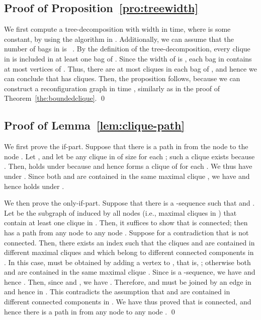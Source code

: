 \documentclass{llncs}
\newcounter{one}
\begin{document}
	\subsection{Proof of Proposition~\ref{pro:treewidth}}
We first compute a tree-decomposition  with width  in  time, where  is some constant,
	by using the algorithm in \cite{BodlaenderDDFLP13}.
	Additionally, we can assume that the number of bags in  is ~\cite{BodlaenderDDFLP13}.
	By the definition of the tree-decomposition, every clique in  is included in at least one bag of .
	Since the width of  is , each bag in  contains at most  vertices of .
	Thus, there are at most  cliques in each bag of , and hence we can conclude that  has  cliques.
	Then, the proposition follows, because we can construct a reconfiguration graph  in time , similarly as in the proof of Theorem~\ref{the:boundedclique}.
	\qed




	\subsection{Proof of Lemma~\ref{lem:clique-path}}
We first prove the if-part.
	Suppose that there is a path  in  from the node  to the node .
	Let , and let  be any clique in  of size  for each ; 
such a clique  exists because . 
	Then,  holds under  because  and hence  forms a clique of  for each .
	We thus have  under . 
	Since both  and  are contained in the same maximal clique , we have  and hence  holds under .
 
	We then prove the only-if-part.
	Suppose that there is a -sequence  such that  and .
	Let  be the subgraph of  induced by all nodes (i.e., maximal cliques in ) that contain at least one clique in .
	Then, it suffices to show that  is connected;
then  has a path from any node  to any node . 
	Suppose for a contradiction that  is not connected. 
	Then, there exists an index  such that the cliques  and  are contained in different maximal cliques  and  which belong to different connected components in . 
	In this case,  must be obtained by adding a vertex  to , that is, ;
otherwise both  and  are contained in the same maximal clique .
	Since  is a -sequence, we have  and hence .
	Then, since  and , we have . 
	Therefore,  and  must be joined by an edge in  and hence in .
	This contradicts the assumption that  and  are contained in different connected components in . 
	We have thus proved that  is connected, and hence there is a path in  from any node  to any node .
	\qed
\end{document}
